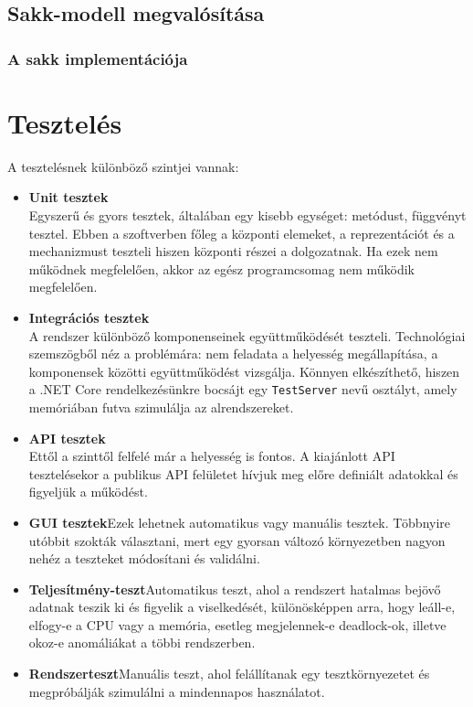 \documentclass[twoside, a4paper, 12pt]{book}
\begin{document}
\section{Sakk-modell megvalósítása}


\subsection{A sakk implementációja}






\newpage
\chapter{Tesztelés}
A tesztelésnek különböző szintjei vannak:
\begin{itemize}
	\item \textbf{Unit tesztek} \\
	Egyszerű és gyors tesztek, általában egy kisebb egységet: metódust, függvényt tesztel. Ebben a szoftverben főleg a központi elemeket, a reprezentációt és a mechanizmust teszteli hiszen központi részei a dolgozatnak. Ha ezek nem működnek megfelelően, akkor az egész programcsomag nem működik megfelelően.
	
	\item \textbf{Integrációs tesztek} \\
	A rendszer különböző komponenseinek együttműködését teszteli. Technológiai szemszögből néz a problémára: nem feladata a helyesség megállapítása, a komponensek közötti együttműködést vizsgálja. Könnyen elkészíthető, hiszen a .NET Core rendelkezésünkre bocsájt egy \texttt{TestServer} nevű osztályt, amely memóriában futva szimulálja az alrendszereket.
	
	\item \textbf{API tesztek} \\
	Ettől a szinttől felfelé már a helyesség is fontos. A kiajánlott API tesztelésekor a publikus API felületet hívjuk meg előre definiált adatokkal és figyeljük a működést.
	
	\item \textbf{GUI tesztek}Ezek lehetnek automatikus vagy manuális tesztek. Többnyire utóbbit szokták választani, mert egy gyorsan változó környezetben nagyon nehéz a teszteket módosítani és validálni.
	
	\item \textbf{Teljesítmény-teszt}Automatikus teszt, ahol a rendszert hatalmas bejövő adatnak teszik ki és figyelik a viselkedését, különösképpen arra, hogy leáll-e, elfogy-e a CPU vagy a memória, esetleg megjelennek-e deadlock-ok, illetve okoz-e anomáliákat a többi rendszerben.
	
	\item \textbf{Rendszerteszt}Manuális teszt, ahol felállítanak egy tesztkörnyezetet és megpróbálják szimulálni a mindennapos használatot.
	
\end{itemize}
\end{document}
